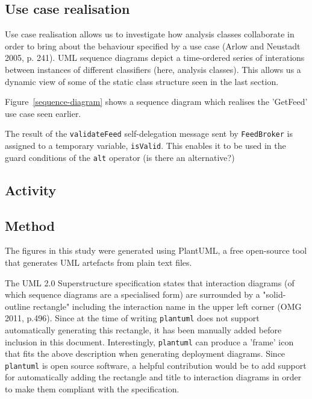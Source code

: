 \documentclass{article}
\begin{document}
\subsection{Use case realisation}



Use case realisation allows us to investigate how analysis classes collaborate in order to bring about the behaviour specified by a use case (Arlow and Neustadt 2005, p. 241). UML sequence diagrams depict a time-ordered series of interations between instances of different classifiers (here, analysis classes). This allows us a dynamic view of some of the static class structure seen in the last section.

Figure~\ref{sequence-diagram} shows a sequence diagram which realises the 'GetFeed' use case seen earlier.

The result of the \texttt{validateFeed} self-delegation message sent by \texttt{FeedBroker} is assigned to a temporary variable, \texttt{isValid}. This enables it to be used in the guard conditions of the \texttt{alt} operator (is there an alternative?)

\subsection{Activity}

\subsection{Method}

The figures in this study were generated using PlantUML, a free open-source tool\cite{plantuml} that generates UML artefacts from plain text files.

The UML 2.0 Superstructure specification states that interaction diagrams (of which sequence diagrams are a specialised form) are surrounded by a "solid-outline rectangle" including the interaction name in the upper left corner (OMG 2011, p.496). Since at the time of writing \texttt{plantuml} does not support automatically generating this rectangle, it has been manually added before inclusion in this document. Interestingly, \texttt{plantuml} can produce a 'frame' icon that fits the above description when generating deployment diagrams. Since \texttt{plantuml} is open source software, a helpful contribution would be to add support for automatically adding the rectangle and title to interaction diagrams in order to make them compliant with the specification. 
\end{document}
